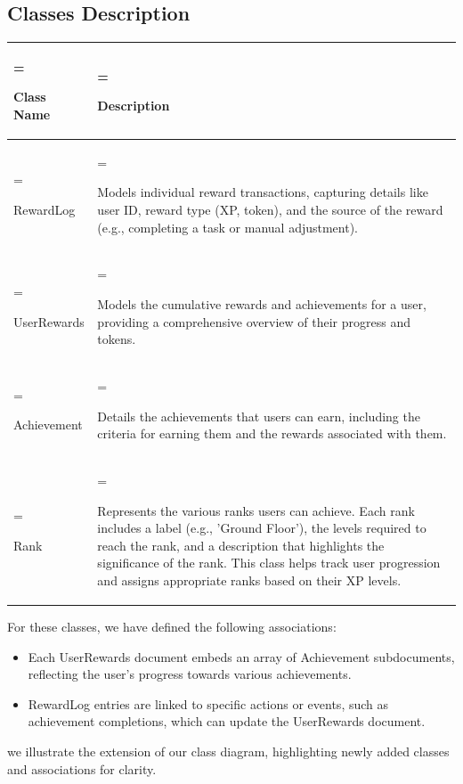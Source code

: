 \subsection{Classes Description}
\begin{table}[H]
    \renewcommand{\arraystretch}{1.5} %
    \centering
    \medskip
    \begin{tabularx}{1\textwidth} {
            | >{\hsize=0.4\hsize\linewidth=\hsize\raggedright\arraybackslash}X
            | >{\hsize=1.6\hsize\linewidth=\hsize\raggedright\arraybackslash}X |}
        \hline
        \rowcolor{primary} \textbf{Class Name} & \textbf{Description} \\
        \hline
        RewardLog & Models individual reward transactions, capturing details like user ID, reward type (XP, token), and the source of the reward (e.g., completing a task or manual adjustment). \\
        \hline
        UserRewards & Models the cumulative rewards and achievements for a user, providing a comprehensive overview of their progress and tokens. \\
        \hline
        Achievement & Details the achievements that users can earn, including the criteria for earning them and the rewards associated with them. \\
        \hline
        Rank & Represents the various ranks users can achieve. Each rank includes a label (e.g., 'Ground Floor'), the levels required to reach the rank, and a description that highlights the significance of the rank. This class helps track user progression and assigns appropriate ranks based on their XP levels. \\
        \hline
    \end{tabularx}
\end{table}



For these classes, we have defined the following associations:
\begin{itemize}
    \item Each UserRewards document embeds an array of Achievement subdocuments, reflecting the user's progress towards various achievements.
    \item RewardLog entries are linked to specific actions or events, such as achievement completions, which can update the UserRewards document.
\end{itemize}
 we illustrate the extension of our class diagram, highlighting newly added classes and associations for clarity.

